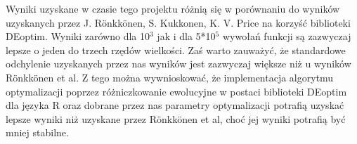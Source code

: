 \documentclass[11pt]{article}
\begin{document}
Wyniki uzyskane w czasie tego projektu różnią się w porównaniu do
wyników uzyskanych przez J. Rönkkönen, S. Kukkonen, K. V. Price na
korzyść biblioteki DEoptim. Wyniki zarówno dla 10$^3$ jak i dla 5*10$^5$
wywołań funkcji są zazwyczaj lepsze o jeden do trzech rzędów
wielkości. Zaś warto zauważyć, że standardowe odchylenie uzyskanych
przez nas wyników jest zazwyczaj większe niż u wyników Rönkkönen et
al. Z tego można wywnioskować, że implementacja algorytmu
optymalizacji poprzez różniczkowanie ewolucyjne w postaci biblioteki
DEoptim dla języka R oraz dobrane przez nas parametry optymalizacji
potrafią uzyskać lepsze wyniki niż uzyskane przez Rönkkönen et al,
choć jej wyniki potrafią być mniej stabilne.
\end{document}

